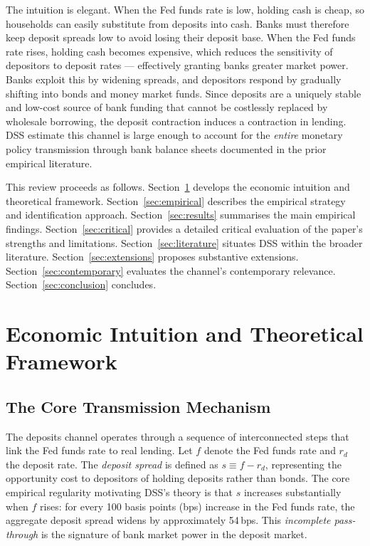 \documentclass[12pt,a4paper]{article}
\begin{document}
The intuition is elegant. When the Fed funds rate is low, holding cash is
cheap, so households can easily substitute from deposits into cash. Banks must
therefore keep deposit spreads low to avoid losing their deposit base.
When the Fed funds rate rises, holding cash becomes expensive, which reduces
the sensitivity of depositors to deposit rates --- effectively granting banks
greater market power. Banks exploit this by widening spreads, and depositors
respond by gradually shifting into bonds and money market funds. Since deposits
are a uniquely stable and low-cost source of bank funding that cannot be
costlessly replaced by wholesale borrowing, the deposit contraction induces a
contraction in lending. DSS estimate this channel is large enough to account
for the \emph{entire} monetary policy transmission through bank balance sheets
documented in the prior empirical literature.

This review proceeds as follows. Section~\ref{sec:mechanism} develops the
economic intuition and theoretical framework. Section~\ref{sec:empirical}
describes the empirical strategy and identification approach.
Section~\ref{sec:results} summarises the main empirical findings.
Section~\ref{sec:critical} provides a detailed critical evaluation of the
paper's strengths and limitations. Section~\ref{sec:literature} situates DSS
within the broader literature. Section~\ref{sec:extensions} proposes
substantive extensions. Section~\ref{sec:contemporary} evaluates the channel's
contemporary relevance. Section~\ref{sec:conclusion} concludes.

\section{Economic Intuition and Theoretical Framework}
\label{sec:mechanism}

\subsection{The Core Transmission Mechanism}

The deposits channel operates through a sequence of interconnected steps that
link the Fed funds rate to real lending. Let $f$ denote the Fed funds rate and
$r_d$ the deposit rate. The \emph{deposit spread} is defined as $s \equiv f -
r_d$, representing the opportunity cost to depositors of holding deposits
rather than bonds. The core empirical regularity motivating DSS's theory is
that $s$ increases substantially when $f$ rises: for every 100 basis points
(bps) increase in the Fed funds rate, the aggregate deposit spread widens by
approximately 54\,bps. This \emph{incomplete pass-through} is the signature of
bank market power in the deposit market.
\end{document}
